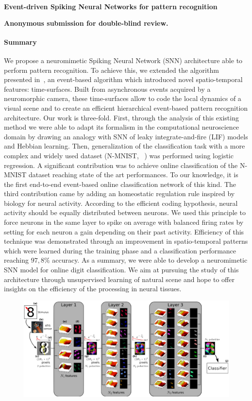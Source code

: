 \documentclass[12pt]{article}
\newcommand{\citet}[1]{\textcite{#1}}
\newcommand{\AuthorAG}{Antoine Grimaldi}
\newcommand{\AuthorLP}{Laurent Perrinet}
\newcommand{\AuthorVB}{Victor Boutin}
\newcommand{\AddressLP}{Institut de Neurosciences de la Timone (UMR 7289); Aix Marseille Univ, CNRS; Marseille, France}%
\newcommand{\AuthorSI}{Sio-Hoi Ieng}
\newcommand{\AuthorRB}{Ryad Benosman}%
\newcommand{\AddressRB}{Sorbonne Université, INSERM, CNRS, Institut de la Vision, France;}%
\newcommand{\Summary}{ %
We propose a neuromimetic Spiking Neural Network (SNN) architecture able to perform pattern recognition. %
To achieve this, we extended the algorithm presented in~\citet{Lagorce17}, an event-based algorithm which introduced novel spatio-temporal features: time-surfaces. Built from asynchronous events acquired by a neuromorphic camera, these time-surfaces allow to code the local dynamics of a visual scene and to create an efficient hierarchical event-based pattern recognition architecture. 
Our work is three-fold. First, through the analysis of this existing method we were able to adapt its formalism in the computational neuroscience domain by drawing an analogy with SNN of leaky integrate-and-fire (LIF) models and Hebbian learning. 
Then, %
generalization of the classification task with a more complex and widely used dataset (N-MNIST, ~\citet{Orchard15}) was performed using logistic regression. A significant contribution was to achieve online classification of the N-MNIST dataset reaching state of the art performances. To our knowledge, it is the first end-to-end event-based online classification network of this kind. The third contribution came by adding an homeostatic regulation rule inspired by biology for neural activity. According to the efficient coding hypothesis, neural activity should be equally distributed between neurons. We used this principle to force neurons in the same layer to spike on average with balanced firing rates by setting for each neuron a gain depending on their past activity. Efficiency of this technique was demonstrated through an improvement in spatio-temporal patterns which were learned during the training phase and a classification performance reaching $97,8\%$ accuracy. As a summary, %
we were able to develop a neuromimetic SNN model for online digit classification. We aim at pursuing the study of this architecture through unsupervised learning of natural scene and hope to offer insights on the efficiency of the processing in neural tissues.
}
\begin{document}
{\Large\bf
Event-driven Spiking Neural Networks %
for
pattern recognition
}

{\bf
Anonymous submission for double-blind review.
}
%

\paragraph*{Summary}
\Summary
%
\begin{figure}
\vspace{-15pt}
\includegraphics[width=1.04\linewidth]{../notebooks/fig/hots.png}
\vspace{-45pt}
\caption*
{\label{fig:fig1}
}
\end{figure}
\end{document}
